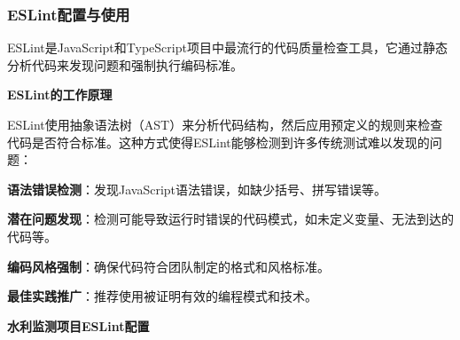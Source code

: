 \subsubsection{ESLint配置与使用}\label{eslintux914dux7f6eux4e0eux4f7fux7528}

ESLint是JavaScript和TypeScript项目中最流行的代码质量检查工具，它通过静态分析代码来发现问题和强制执行编码标准。

\textbf{ESLint的工作原理}

ESLint使用抽象语法树（AST）来分析代码结构，然后应用预定义的规则来检查代码是否符合标准。这种方式使得ESLint能够检测到许多传统测试难以发现的问题：

\textbf{语法错误检测}：发现JavaScript语法错误，如缺少括号、拼写错误等。

\textbf{潜在问题发现}：检测可能导致运行时错误的代码模式，如未定义变量、无法到达的代码等。

\textbf{编码风格强制}：确保代码符合团队制定的格式和风格标准。

\textbf{最佳实践推广}：推荐使用被证明有效的编程模式和技术。

\textbf{水利监测项目ESLint配置}


